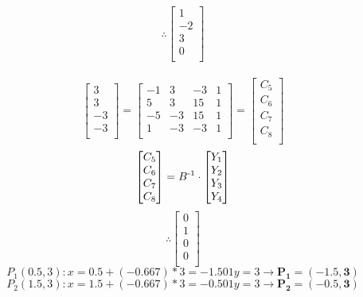 \[
\therefore
\begin{bmatrix}
   1\\
  -2\\
   3\\
   0\\
\end{bmatrix}
\]
\\
\noindent{}
\[
\begin{bmatrix}
    3\\
    3\\
   -3\\
   -3\\
\end{bmatrix}=
\begin{bmatrix}
   -1 & 3 & -3 & 1\\
    5 & 3 & 15 & 1\\
   -5 & -3 & 15 & 1\\
    1 & -3 & -3 & 1\\
\end{bmatrix}=
\begin{bmatrix}
   C_5\\
   C_6\\
   C_7\\
   C_8\\
\end{bmatrix}
\]
\noindent{}
\[
\begin{bmatrix}
   C_5\\
   C_6\\
   C_7\\
   C_8\\
\end{bmatrix}=
B\textsuperscript{-1} \cdot 
\begin{bmatrix}
   Y_1\\
   Y_2\\
   Y_3\\
   Y_4\\
\end{bmatrix}
\]
\[
\therefore
\begin{bmatrix}
   0\\
   1\\
   0\\
   0\\
\end{bmatrix}
\]
\noindent{}
\[
P_1(0.5, 3): x = 0.5 + (-0.667)*3 = -1.501 y = 3 \rightarrow \mathbf{P_1 = (-1.5, 3)}
\]
\vspace{0.1cm}
\[
P_2(1.5, 3): x = 1.5 + (-0.667)*3 = -0.501 y = 3 \rightarrow \mathbf{P_2 = (-0.5, 3)}
\]
